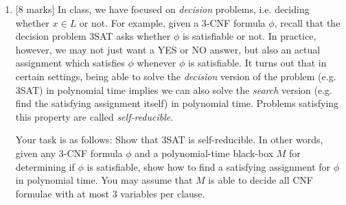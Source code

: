 \documentclass{article}
\begin{document}
\begin{enumerate}

    \item {[8 marks]} In class, we have focused on \emph{decision} problems, i.e. deciding whether $x\in L$ or not. For example, given a 3-CNF formula $\phi$, recall that the decision problem 3SAT asks whether $\phi$ is satisfiable or not. In practice, however, we may not just want a YES or NO answer, but also an actual assignment which satisfies $\phi$ whenever $\phi$ is satisfiable. It turns out that in certain settings, being able to solve the \emph{decision} version of the problem (e.g. 3SAT) in polynomial time implies we can also solve the \emph{search} version (e.g. find the satisfying assignment itself) in polynomial time. Problems satisfying this property are called \emph{self-reducible}.

Your task is as follows: Show that 3SAT is self-reducible. In other words, given any 3-CNF formula $\phi$ and a polynomial-time black-box $M$ for determining if $\phi$ is satisfiable, show how to find a satisfying assignment for $\phi$ in polynomial time. You may assume that $M$ is able to decide all CNF formulae with {at most} 3 variables per clause.


\end{enumerate}
\end{document}
